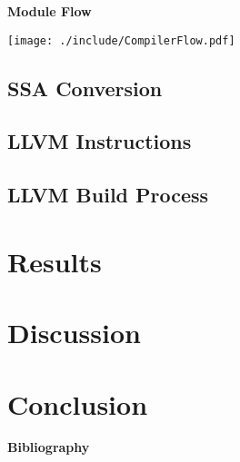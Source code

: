 \documentclass{beamer}
\begin{document}
\begin{frame}{\bf Module Flow}
  \begin{center}
    \texttt{[image: ./include/CompilerFlow.pdf]}
  \end{center}
\end{frame}

\subsection{SSA Conversion}

\subsection{LLVM Instructions}

\subsection{LLVM Build Process}

\section{Results}

\section{Discussion}

\section{Conclusion}

\begin{frame}[t,allowframebreaks]{\bf Bibliography}
  \nocite{*}
  \printbibliography
\end{frame}
\end{document}
